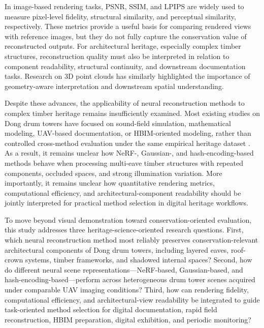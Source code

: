 In image-based rendering tasks, PSNR, SSIM, and LPIPS are widely used to
measure pixel-level fidelity, structural similarity, and perceptual
similarity, respectively\cite{wang2004ssim,zhang2018lpips}. These metrics provide a useful
basis for comparing rendered views with reference images, but they do
not fully capture the conservation value of reconstructed outputs. For
architectural heritage, especially complex timber structures,
reconstruction quality must also be interpreted in relation to component
readability, structural continuity, and downstream documentation tasks.
Research on 3D point clouds has similarly highlighted the importance of
geometry-aware interpretation and downstream spatial understanding\cite{guo2021deeplearning3d}.

Despite these advances, the applicability of neural reconstruction
methods to complex timber heritage remains insufficiently examined. Most
existing studies on Dong drum towers have focused on sound-field
simulation, mathematical modeling, UAV-based documentation, or
HBIM-oriented modeling, rather than controlled cross-method evaluation
under the same empirical heritage dataset\cite{mao2023soundfield,deng2021metamodeling,huang2024digital,deng2025hbim}
. As a result, it
remains unclear how NeRF-, Gaussian-, and hash-encoding-based methods
behave when processing multi-eave timber structures with repeated
components, occluded spaces, and strong illumination variation. More
importantly, it remains unclear how quantitative rendering metrics,
computational efficiency, and architectural-component readability should
be jointly interpreted for practical method selection in digital
heritage workflows.

To move beyond visual demonstration toward conservation-oriented
evaluation, this study addresses three heritage-science-oriented
research questions. First, which neural reconstruction method most
reliably preserves conservation-relevant architectural components of
Dong drum towers, including layered eaves, roof-crown systems, timber
frameworks, and shadowed internal spaces? Second, how do different
neural scene representations---NeRF-based, Gaussian-based, and
hash-encoding-based---perform across heterogeneous drum tower scenes
acquired under comparable UAV imaging conditions? Third, how can
rendering fidelity, computational efficiency, and architectural-view
readability be integrated to guide task-oriented method selection for
digital documentation, rapid field reconstruction, HBIM preparation,
digital exhibition, and periodic monitoring?

